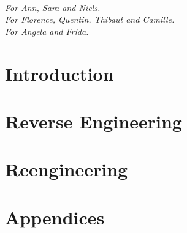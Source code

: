 \documentclass[a4paper,10pt,twoside]{book}
\begin{document}
\vfill
\newpage
~\vfill
\begin{center}
\emph{For Ann, Sara and Niels.\\
For Florence, Quentin, Thibaut and Camille.\\
For Angela and Frida.}
\end{center}
\vfill
\cleardoublepage

\tableofcontents
\sloppy %

\mainmatter
\part{Introduction}

\part{Reverse Engineering}




\part{Reengineering}





\appendix
\part{Appendices}



{\small\raggedright\printindex}
\markboth{}{}
\pagestyle{empty}
\cleardoublepage
~ %
\cleardoublepage
~ %
\cleardoublepage
\end{document}
